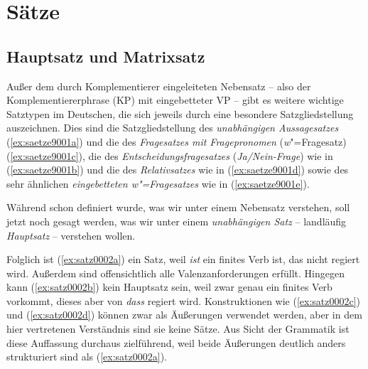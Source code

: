 \chapter{Sätze}

\label{sec:saetze}

\section{Hauptsatz und Matrixsatz}

Außer dem durch Komplementierer eingeleiteten Nebensatz -- also der Komplementiererphrase (KP) mit eingebetteter VP -- gibt es weitere wichtige Satztypen im Deutschen, die sich jeweils durch eine besondere Satzgliedstellung auszeichnen.
Dies sind die Satzgliedstellung des \textit{unabhängigen Aussagesatzes} (\ref{ex:saetze9001a}) und die des \textit{Fragesatzes mit Fragepronomen} (\textit{w}"=Fragesatz) (\ref{ex:saetze9001c}), die des \textit{Entscheidungsfragesatzes} (\textit{Ja\slash Nein-Frage}) wie in (\ref{ex:saetze9001b}) und die des \textit{Relativsatzes} wie in (\ref{ex:saetze9001d}) sowie des sehr ähnlichen \textit{eingebetteten \textit{w}"=Fragesatzes} wie in (\ref{ex:saetze9001e}).

\begin{exe}
  \ex\label{ex:saetze9001}
  \begin{xlist}
  \end{xlist}
\end{exe}

Während schon definiert wurde, was wir unter einem Nebensatz verstehen, soll jetzt noch gesagt werden, was wir unter einem \textit{unabhängigen Satz} -- landläufig \textit{Hauptsatz} -- verstehen wollen.


Folglich ist (\ref{ex:satz0002a}) ein Satz, weil \textit{ist} ein finites Verb ist, das nicht regiert wird.
Außerdem sind offensichtlich alle Valenzanforderungen erfüllt.
Hingegen kann (\ref{ex:satz0002b}) kein Hauptsatz sein, weil zwar genau ein finites Verb vorkommt, dieses aber von \textit{dass} regiert wird.
Konstruktionen wie (\ref{ex:satz0002c}) und (\ref{ex:satz0002d}) können zwar als Äußerungen verwendet werden, aber in dem hier vertretenen Verständnis sind sie keine Sätze.
Aus Sicht der Grammatik ist diese Auffassung durchaus zielführend, weil beide Äußerungen deutlich anders strukturiert sind als (\ref{ex:satz0002a}).

